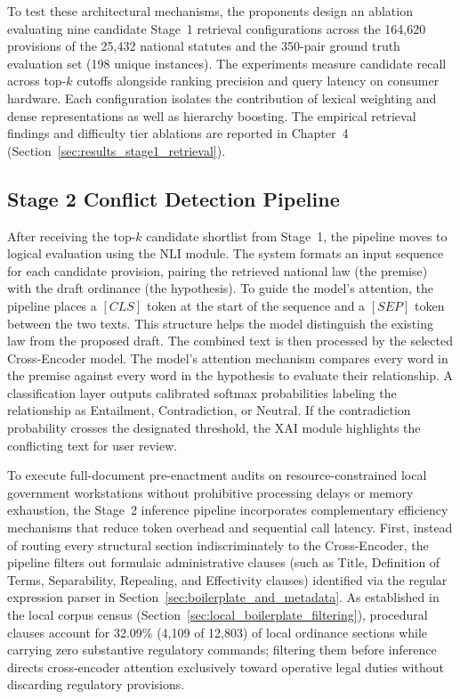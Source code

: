     To test these architectural mechanisms, the proponents design an ablation evaluating nine candidate Stage~1 retrieval configurations across the 164,620 provisions of the 25,432 national statutes and the 350-pair ground truth evaluation set (198 unique instances). The experiments measure candidate recall across top-$k$ cutoffs alongside ranking precision and query latency on consumer hardware. Each configuration isolates the contribution of lexical weighting and dense representations as well as hierarchy boosting. The empirical retrieval findings and difficulty tier ablations are reported in Chapter~4 (Section~\ref{sec:results_stage1_retrieval}).

    \subsection{Stage 2 Conflict Detection Pipeline}
    \label{sec:stage2_nli_pipeline}
    After receiving the top-$k$ candidate shortlist from Stage~1, the pipeline moves to logical evaluation using the NLI module. The system formats an input sequence for each candidate provision, pairing the retrieved national law (the premise) with the draft ordinance (the hypothesis). To guide the model's attention, the pipeline places a $[CLS]$ token at the start of the sequence and a $[SEP]$ token between the two texts. This structure helps the model distinguish the existing law from the proposed draft. The combined text is then processed by the selected Cross-Encoder model. The model's attention mechanism compares every word in the premise against every word in the hypothesis to evaluate their relationship. A classification layer outputs calibrated softmax probabilities labeling the relationship as Entailment, Contradiction, or Neutral. If the contradiction probability crosses the designated threshold, the XAI module highlights the conflicting text for user review.

    To execute full-document pre-enactment audits on resource-constrained local government workstations without prohibitive processing delays or memory exhaustion, the Stage~2 inference pipeline incorporates complementary efficiency mechanisms that reduce token overhead and sequential call latency. First, instead of routing every structural section indiscriminately to the Cross-Encoder, the pipeline filters out formulaic administrative clauses (such as Title, Definition of Terms, Separability, Repealing, and Effectivity clauses) identified via the regular expression parser in Section~\ref{sec:boilerplate_and_metadata}. As established in the local corpus census (Section~\ref{sec:local_boilerplate_filtering}), procedural clauses account for 32.09\% (4,109 of 12,803) of local ordinance sections while carrying zero substantive regulatory commands; filtering them before inference directs cross-encoder attention exclusively toward operative legal duties without discarding regulatory provisions.

